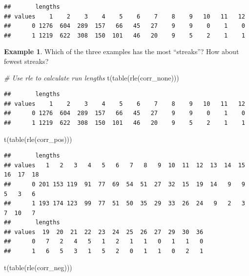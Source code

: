 \documentclass[
  11pt,
]{book}
\newenvironment{Shaded}{\begin{snugshade}}{\end{snugshade}}
\newcommand{\CommentTok}[1]{\textcolor[rgb]{0.56,0.35,0.01}{\textit{#1}}}
\newcommand{\FunctionTok}[1]{\textcolor[rgb]{0.00,0.00,0.00}{#1}}
\newcommand{\NormalTok}[1]{#1}
\theoremstyle{definition}
\theoremstyle{definition}
\newtheorem{example}{Example}[chapter]
\theoremstyle{definition}
\theoremstyle{definition}
\theoremstyle{remark}
\begin{document}
\begin{verbatim}
##       lengths
## values    1    2    3    4    5    6    7    8    9   10   11   12
##      0 1276  604  289  157   66   45   27    9    9    0    1    0
##      1 1219  622  308  150  101   46   20    9    5    2    1    1
\end{verbatim}

\smallskip

\begin{example}
Which of the three examples has the most ``streaks''? How about fewest streaks?
\end{example}

\begin{Shaded}
\begin{Highlighting}[]
\CommentTok{\# Use rle to calculate run lengths}
\FunctionTok{t}\NormalTok{(}\FunctionTok{table}\NormalTok{(}\FunctionTok{rle}\NormalTok{(corr\_none)))}
\end{Highlighting}
\end{Shaded}

\begin{verbatim}
##       lengths
## values    1    2    3    4    5    6    7    8    9   10   11   12
##      0 1276  604  289  157   66   45   27    9    9    0    1    0
##      1 1219  622  308  150  101   46   20    9    5    2    1    1
\end{verbatim}

\begin{Shaded}
\begin{Highlighting}[]
\FunctionTok{t}\NormalTok{(}\FunctionTok{table}\NormalTok{(}\FunctionTok{rle}\NormalTok{(corr\_pos)))}
\end{Highlighting}
\end{Shaded}

\begin{verbatim}
##       lengths
## values   1   2   3   4   5   6   7   8   9  10  11  12  13  14  15  16  17  18
##      0 201 153 119  91  77  69  54  51  27  32  15  19  14   9   9   5   3   6
##      1 193 174 123  99  77  51  50  35  29  33  26  24   9   2   3   7  10   7
##       lengths
## values  19  20  21  22  23  24  25  26  27  29  30  36
##      0   7   2   4   5   1   2   1   1   0   1   1   0
##      1   6   5   3   1   5   2   0   1   1   0   2   1
\end{verbatim}

\begin{Shaded}
\begin{Highlighting}[]
\FunctionTok{t}\NormalTok{(}\FunctionTok{table}\NormalTok{(}\FunctionTok{rle}\NormalTok{(corr\_neg)))}
\end{Highlighting}
\end{Shaded}
\end{document}
